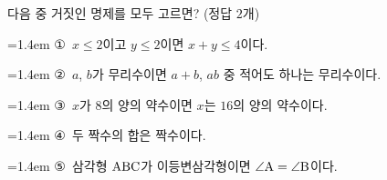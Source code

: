 다음 중 거짓인 명제를 모두 고르면? (정답 $2$개)
\par\medskip\par\noindent\hangindent=1.4em {\small ①}\ $x\le 2$이고 $y\le 2$이면 $x+y\le 4$이다.\par\noindent\hangindent=1.4em {\small ②}\ $a$, $b$가 무리수이면 $a+b$, $ab$ 중 적어도 하나는 무리수이다.\par\noindent\hangindent=1.4em {\small ③}\ $x$가 $8$의 양의 약수이면 $x$는 $16$의 양의 약수이다.\par\noindent\hangindent=1.4em {\small ④}\ 두 짝수의 합은 짝수이다.\par\noindent\hangindent=1.4em {\small ⑤}\ 삼각형 $\mathrm{ABC}$가 이등변삼각형이면 $\angle\mathrm{A}=\angle\mathrm{B}$이다.\par\medskip
